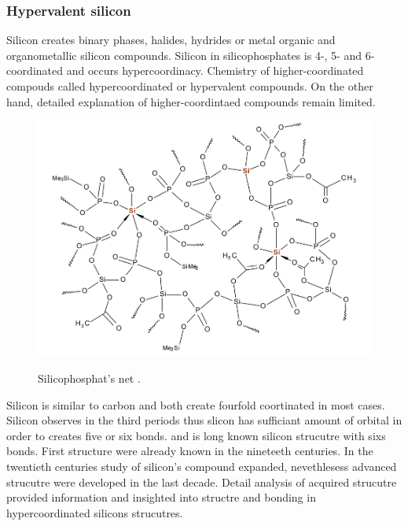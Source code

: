 \documentclass[
  digital, %
  table,   %
  lof,     %
  lot,     %
]{fithesis3}
\begin{document}
\subsubsection{Hypervalent silicon}
 Silicon creates binary phases, halides, hydrides or metal organic and organometallic silicon compounds. Silicon in silicophosphates is 4-, 5- and 6- coordinated and occurs hypercoordinacy. Chemistry of higher-coordinated compouds called hypercoordinated or hypervalent compounds. On the other hand, detailed explanation of higher-coordintaed compounds remain limited.
\begin{figure}[h!]
\caption{Silicophosphat's net \cite{Styskalik2015thesis}. }
  \center
  \includegraphics[width=12cm]{si_polymer_cely.png}
  \label{si_polymer_cely}
  \end{figure}
Silicon is similar to carbon and both create fourfold coortinated in most cases. Silicon observes in the third periods thus slicon has sufficiant amount of orbital in order to creates five or six bonds.  and  is long known silicon strucutre with sixs bonds. First structure were already known in the nineteeth centuries. In the twentieth centuries study of silicon's compound expanded, nevethlesess advanced strucutre were developed in the last decade.
Detail analysis of acquired strucutre provided information and insighted into structre and bonding in hypercoordinated silicons strucutres. \cite{Wagler2014}\\
\end{document}
